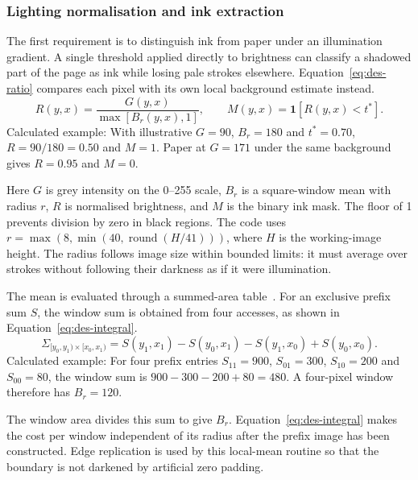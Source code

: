 \subsubsection{Lighting normalisation and ink extraction}
The first requirement is to distinguish ink from paper under an illumination gradient. A single threshold applied directly to brightness can classify a shadowed part of the page as ink while losing pale strokes elsewhere. Equation~\ref{eq:des-ratio} compares each pixel with its own local background estimate instead.
\begin{equation}
R(y,x)=\frac{G(y,x)}{\max[B_r(y,x),1]},\qquad
M(y,x)=\mathbf{1}[R(y,x)<t^*].
\label{eq:des-ratio}
\end{equation}
Calculated example: With illustrative $G=90$, $B_r=180$ and $t^*=0.70$, $R=90/180=0.50$ and $M=1$. Paper at $G=171$ under the same background gives $R=0.95$ and $M=0$. \cite[segment.py, Deskew]{braunepipeline2026}

Here $G$ is grey intensity on the 0--255 scale, $B_r$ is a square-window mean with radius $r$, $R$ is normalised brightness, and $M$ is the binary ink mask. The floor of 1 prevents division by zero in black regions. The code uses $r=\max(8,\min(40,\operatorname{round}(H/41)))$, where $H$ is the working-image height. The radius follows image size within bounded limits: it must average over strokes without following their darkness as if it were illumination.~\cite[segment.py]{braunepipeline2026}

The mean is evaluated through a summed-area table~\cite[page to verify]{crow1984}. For an exclusive prefix sum $S$, the window sum is obtained from four accesses, as shown in Equation~\ref{eq:des-integral}.
\begin{equation}
\Sigma_{[y_0,y_1)\times[x_0,x_1)}=
S(y_1,x_1)-S(y_0,x_1)-S(y_1,x_0)+S(y_0,x_0).
\label{eq:des-integral}
\end{equation}
Calculated example: For four prefix entries $S_{11}=900$, $S_{01}=300$, $S_{10}=200$ and $S_{00}=80$, the window sum is $900-300-200+80=480$. A four-pixel window therefore has $B_r=120$. \cite[segment.py, Integral and BoxSum]{braunepipeline2026}

The window area divides this sum to give $B_r$. Equation~\ref{eq:des-integral} makes the cost per window independent of its radius after the prefix image has been constructed. Edge replication is used by this local-mean routine so that the boundary is not darkened by artificial zero padding.~\cite[segment.py]{braunepipeline2026}

